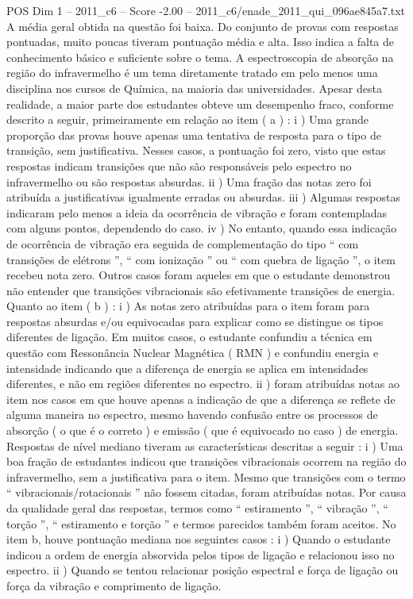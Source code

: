 \begin{textsample}{POS Dim 1 – 2011\_c6 – Score -2.00 – 2011\_c6/enade\_2011\_qui\_096ae845a7.txt}
A média geral obtida na questão foi baixa.
Do conjunto de provas com respostas pontuadas, muito poucas tiveram pontuação média e alta.
Isso indica a falta de conhecimento básico e suficiente sobre o tema.
A espectroscopia de absorção na região do infravermelho é um tema diretamente tratado em pelo menos uma disciplina nos cursos de Química, na maioria das universidades.
Apesar desta realidade, a maior parte dos estudantes obteve um desempenho fraco, conforme descrito a seguir, primeiramente em relação ao item ( a ) : i ) Uma grande proporção das provas houve apenas uma tentativa de resposta para o tipo de transição, sem justificativa.
Nesses casos, a pontuação foi zero, visto que estas respostas indicam transições que não são responsáveis pelo espectro no infravermelho ou são respostas absurdas. ii ) Uma fração das notas zero foi atribuída a justificativas igualmente erradas ou absurdas. iii ) Algumas respostas indicaram pelo menos a ideia da ocorrência de vibração e foram contempladas com alguns pontos, dependendo do caso. iv ) No entanto, quando essa indicação de ocorrência de vibração era seguida de complementação do tipo “ com transições de elétrons ”, “ com ionização ” ou “ com quebra de ligação ”, o item recebeu nota zero.
Outros casos foram aqueles em que o estudante demonstrou não entender que transições vibracionais são efetivamente transições de energia.
Quanto ao item ( b ) : i ) As notas zero atribuídas para o item foram para respostas absurdas e/ou equivocadas para explicar como se distingue os tipos diferentes de ligação.
Em muitos casos, o estudante confundiu a técnica em questão com Ressonância Nuclear Magnética ( RMN ) e confundiu energia e intensidade indicando que a diferença de energia se aplica em intensidades diferentes, e não em regiões diferentes no espectro. ii ) foram atribuídas notas ao item nos casos em que houve apenas a indicação de que a diferença se reflete de alguma maneira no espectro, mesmo havendo confusão entre os processos de absorção ( o que é o correto ) e emissão ( que é equivocado no caso ) de energia.
Respostas de nível mediano tiveram as características descritas a seguir : i ) Uma boa fração de estudantes indicou que transições vibracionais ocorrem na região do infravermelho, sem a justificativa para o item.
Mesmo que transições com o termo “ vibracionais/rotacionais ” não fossem citadas, foram atribuídas notas.
Por causa da qualidade geral das respostas, termos como “ estiramento ”, “ vibração ”, “ torção ”, “ estiramento e torção ” e termos parecidos também foram aceitos.
No item b, houve pontuação mediana nos seguintes casos : i ) Quando o estudante indicou a ordem de energia absorvida pelos tipos de ligação e relacionou isso no espectro. ii ) Quando se tentou relacionar posição espectral e força de ligação ou força da vibração e comprimento de ligação.

\end{textsample}

